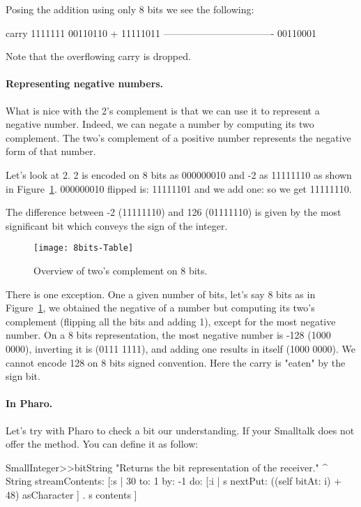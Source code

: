 \documentclass[a4paper,10pt,twoside]{book}
\begin{document}
Posing the addition using only 8 bits we see the following:

\begin{code}{}
carry	1111111 
		 00110110
+		11111011	
	----------------------------------
		 00110001	
\end{code}

Note that the overflowing carry is dropped.

\paragraph{Representing negative numbers.}
What is nice with the 2's complement is that we can use it to represent a negative number. Indeed, we can negate a number by computing its two complement. The two's complement of a positive number represents the negative form of that number.

Let's look at 2. 2 is encoded on 8 bits as 000000010 and -2 as 11111110 as shown in Figure~\ref{negativePositive}.
000000010 flipped is: 11111101 and we add one: so we get 11111110.



The difference between  -2 (11111110) and 126 (01111110) is given by the most significant bit which conveys the sign of the integer.

\begin{figure}[h]
\begin{center}
\texttt{[image: 8bits-Table]}
\caption{Overview of two's complement on 8 bits.\label{negativePositive}}
\end{center}
\end{figure}



There is one exception. One a given number of bits, let's say 8 bits as in Figure~\ref{negativePositive},
we obtained the negative of a number but computing its two's complement (flipping all the bits and adding 1), except for the most negative number. On a 8 bits representation, the most negative number is -128 (1000 0000), inverting it is (0111 1111), and adding one results in itself (1000 0000). We cannot encode 128 on 8 bits signed convention. Here the carry is "eaten" by the sign bit. 


\paragraph{In Pharo.}
Let's try with Pharo to check a bit our understanding. 
If your Smalltalk does not offer the  method. You can define it as follow:
\begin{code}{}
SmallInteger>>bitString
	"Returns the bit representation of the receiver."
	^ String streamContents: [:s | 
		30 to: 1 by: -1 do: [:i | s nextPut: ((self bitAt: i) + 48) asCharacter ] .
		s contents ]
\end{code}
	
\end{document}
